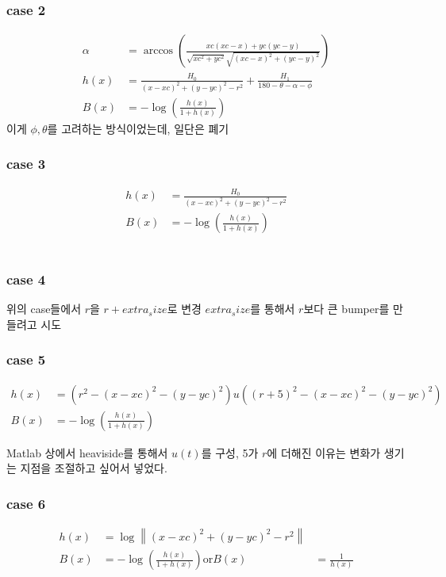 \documentclass[journal]{IEEEtran}
\begin{document}
\subsubsection{case 2}
\begin{align*}
	\alpha&=\arccos\left(\frac{xc(xc-x)+yc(yc-y)}{\sqrt{xc^2+yc^2}\sqrt{(xc-x)^2+(yc-y)^2}}\right)\\
	h(x)&=\frac{H_0}{(x-xc)^2+(y-yc)^2-r^2}+\frac{H_1}{180-\theta-\alpha-\phi}\\
	B(x)&=-\log\left( \frac{h(x)}{1+h(x)}\right)
\end{align*}
이게 $\phi, \theta$를 고려하는 방식이었는데, 일단은 폐기
\\
\subsubsection{case 3}

\begin{align*}
	h(x)&=\frac{H_0}{(x-xc)^2+(y-yc)^2-r^2}\\
	B(x)&=-\log\left( \frac{h(x)}{1+h(x)}\right)
\end{align*}
\\
\subsubsection{case 4}

위의 case들에서 $r$을 $r+extra_size$로 변경 $extra_size$를 통해서 $r$보다 큰 bumper를 만들려고 시도
\\
\subsubsection{case 5}

\begin{align*}
	h(x)&=(r^2-(x-xc)^2-(y-yc)^2)u((r+5)^2-(x-xc)^2-(y-yc)^2)\\
	B(x)&=-\log\left( \frac{h(x)}{1+h(x)}\right)
\end{align*}

Matlab 상에서 heaviside를 통해서 $u(t)$를 구성, 5가 $r$에 더해진 이유는 변화가 생기는 지점을 조절하고 싶어서 넣었다.
\\
\subsubsection{case 6}

\begin{align*}
	h(x)&=\log \left\| (x-xc)^2+(y-yc)^2-r^2 \right\|  \\
	B(x)&=-\log\left( \frac{h(x)}{1+h(x)}\right)
	\text{or}
	B(x)&=\frac{1}{h(x)}
\end{align*}
\end{document}
